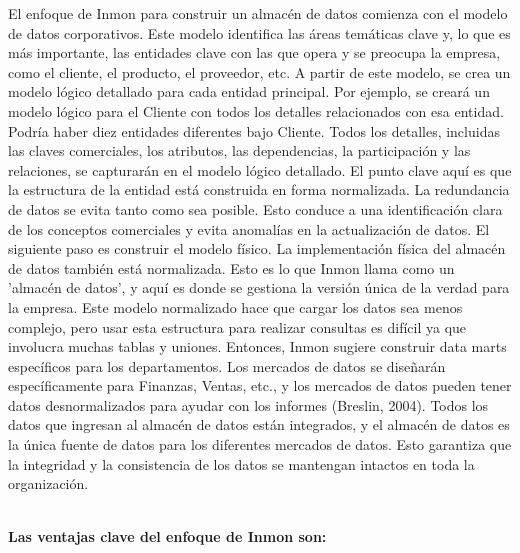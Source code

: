 \documentclass[twoside,twocolumn]{article}
\begin{document}
\begin{enumerate}
El enfoque de Inmon para construir un almacén de datos comienza con el modelo de datos corporativos. Este modelo identifica las áreas temáticas clave y, lo que es más importante, las entidades clave con las que opera y se preocupa la empresa, como el cliente, el producto, el proveedor, etc. A partir de este modelo, se crea un modelo lógico detallado para cada entidad principal. Por ejemplo, se creará un modelo lógico para el Cliente con todos los detalles relacionados con esa entidad. Podría haber diez entidades diferentes bajo Cliente. Todos los detalles, incluidas las claves comerciales, los atributos, las dependencias, la participación y las relaciones, se capturarán en el modelo lógico detallado. El punto clave aquí es que la estructura de la entidad está construida en forma normalizada. La redundancia de datos se evita tanto como sea posible. Esto conduce a una identificación clara de los conceptos comerciales y evita anomalías en la actualización de datos. El siguiente paso es construir el modelo físico. La implementación física del almacén de datos también está normalizada. Esto es lo que Inmon llama como un 'almacén de datos', y aquí es donde se gestiona la versión única de la verdad para la empresa. Este modelo normalizado hace que cargar los datos sea menos complejo, pero usar esta estructura para realizar consultas es difícil ya que involucra muchas tablas y uniones. Entonces, Inmon sugiere construir data marts específicos para los departamentos. Los mercados de datos se diseñarán específicamente para Finanzas, Ventas, etc., y los mercados de datos pueden tener datos desnormalizados para ayudar con los informes (Breslin, 2004). Todos los datos que ingresan al almacén de datos están integrados, y el almacén de datos es la única fuente de datos para los diferentes mercados de datos. Esto garantiza que la integridad y la consistencia de los datos se mantengan intactos en toda la organización.

\textbf{}\\
\textbf{Las ventajas clave del enfoque de Inmon son:}
\textbf{}\\


\end{enumerate}
\end{document}
